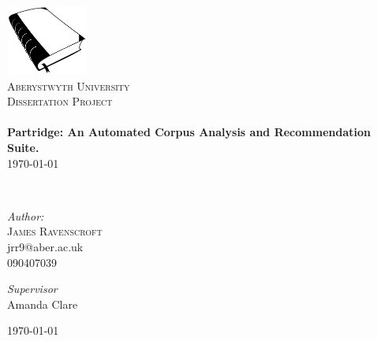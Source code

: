 \begin{titlepage}
 
\begin{center}
 
\includegraphics[width=0.20\textwidth]{../cover_logo.png}\\[1cm]
 
\textsc{\LARGE Aberystwyth University}\\[1.5cm]
 
\textsc{\LARGE Dissertation Project}\\[0.5cm]
 
 
\HRule \\[0.4cm]
{ \huge \bfseries Partridge: An Automated Corpus Analysis and
Recommendation Suite.}\\[0.4cm]

\today
 
\HRule \\[1.5cm]

\begin{minipage}{0.4\textwidth}
\begin{flushleft} \large
\emph{Author:}\\
\textsc{James Ravenscroft}\\
jrr9@aber.ac.uk\\
090407039 
\end{flushleft}
\end{minipage}
\begin{minipage}{0.4\textwidth}
\begin{flushright} \large
\emph{Supervisor} \\
Amanda Clare

\end{flushright}
\end{minipage}

\vfill
 
{\large \today}
 
\end{center}
 
\end{titlepage}


